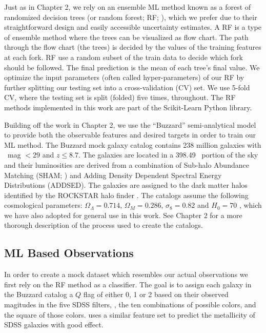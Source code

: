 Just as in Chapter 2, we rely on an ensemble ML method  known as a forest of randomized decision trees (or random forest; RF; \citealt{Ho1995, Ho1998}), which we prefer due to their straightforward design and easily accessible uncertainty estimates. A RF is a type of ensemble method where the trees can be visualized as flow chart. The path through the flow chart (the trees) is decided by the values of the training features at each fork. RF use a random subset of the train data to decide which fork should be followed. The final prediction is the mean of each tree's final value. We optimize the input parameters (often called hyper-parameters) of our RF by further splitting our testing set into a cross-validation (CV) set. We use 5-fold CV, where the testing set is split (folded) five times, throughout. The RF methods implemented in this work are part of the {\sc Scikit-Learn} \citep{Pedregosa2012} Python library.

Building off the work in Chapter 2, we use the ``Buzzard'' semi-analytical model to provide both the observable features and desired targets in order to train our ML method. The Buzzard mock galaxy catalog contains 238 million galaxies with \sdssr\ mag $< 29$ and $z \leq 8.7$. The galaxies are located in a 398.49 \degsq\ portion of the sky and their luminosities are derived from a combination of Sub-halo Abundance Matching (SHAM; \citealt{Reddick2013}) and Adding Density Dependent Spectral Energy Distributions (ADDSED). The galaxies are assigned to the dark matter halos identified by the {\sc ROCKSTAR} halo finder \citep{Behroozi2013}. The catalogs assume the following cosmological parameters: $\Omega_\Lambda = 0.714$, $\Omega_M = 0.286$, $\sigma_8 = 0.82$ and $H_0= 70$ \kms \mpc, which we have also adopted for general use in this work. See Chapter 2 for a more thorough description of the process used to create the catalogs.

\subsection{ML Based Observations}
In order to create a mock dataset which resembles our actual observations we first rely on the RF method as a classifier. The goal is to assign each galaxy in the Buzzard catalog a $Q$ flag of either 0, 1 or 2 based on their observed magitudes in the five SDSS filters, \sdssu\sdssg\sdssr\sdssi\sdssz, the ten combinations of possible colors, and the square of those colors. \cite{Acquaviva2016} uses a similar feature set to predict the metallicity of SDSS galaxies with good effect. 

